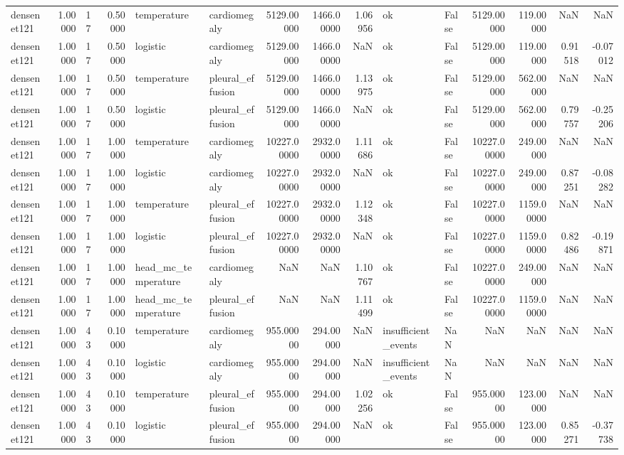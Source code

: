 \begin{tabular}{lrlrllrrrllrrrr}
densenet121 & 1.00000 & 17 & 0.50000 & temperature & cardiomegaly & 5129.00000 & 1466.00000 & 1.06956 & ok & False & 5129.00000 & 119.00000 & NaN & NaN \\
densenet121 & 1.00000 & 17 & 0.50000 & logistic & cardiomegaly & 5129.00000 & 1466.00000 & NaN & ok & False & 5129.00000 & 119.00000 & 0.91518 & -0.07012 \\
densenet121 & 1.00000 & 17 & 0.50000 & temperature & pleural\_effusion & 5129.00000 & 1466.00000 & 1.13975 & ok & False & 5129.00000 & 562.00000 & NaN & NaN \\
densenet121 & 1.00000 & 17 & 0.50000 & logistic & pleural\_effusion & 5129.00000 & 1466.00000 & NaN & ok & False & 5129.00000 & 562.00000 & 0.79757 & -0.25206 \\
densenet121 & 1.00000 & 17 & 1.00000 & temperature & cardiomegaly & 10227.00000 & 2932.00000 & 1.11686 & ok & False & 10227.00000 & 249.00000 & NaN & NaN \\
densenet121 & 1.00000 & 17 & 1.00000 & logistic & cardiomegaly & 10227.00000 & 2932.00000 & NaN & ok & False & 10227.00000 & 249.00000 & 0.87251 & -0.08282 \\
densenet121 & 1.00000 & 17 & 1.00000 & temperature & pleural\_effusion & 10227.00000 & 2932.00000 & 1.12348 & ok & False & 10227.00000 & 1159.00000 & NaN & NaN \\
densenet121 & 1.00000 & 17 & 1.00000 & logistic & pleural\_effusion & 10227.00000 & 2932.00000 & NaN & ok & False & 10227.00000 & 1159.00000 & 0.82486 & -0.19871 \\
densenet121 & 1.00000 & 17 & 1.00000 & head\_mc\_temperature & cardiomegaly & NaN & NaN & 1.10767 & ok & False & 10227.00000 & 249.00000 & NaN & NaN \\
densenet121 & 1.00000 & 17 & 1.00000 & head\_mc\_temperature & pleural\_effusion & NaN & NaN & 1.11499 & ok & False & 10227.00000 & 1159.00000 & NaN & NaN \\
densenet121 & 1.00000 & 43 & 0.10000 & temperature & cardiomegaly & 955.00000 & 294.00000 & NaN & insufficient\_events & NaN & NaN & NaN & NaN & NaN \\
densenet121 & 1.00000 & 43 & 0.10000 & logistic & cardiomegaly & 955.00000 & 294.00000 & NaN & insufficient\_events & NaN & NaN & NaN & NaN & NaN \\
densenet121 & 1.00000 & 43 & 0.10000 & temperature & pleural\_effusion & 955.00000 & 294.00000 & 1.02256 & ok & False & 955.00000 & 123.00000 & NaN & NaN \\
densenet121 & 1.00000 & 43 & 0.10000 & logistic & pleural\_effusion & 955.00000 & 294.00000 & NaN & ok & False & 955.00000 & 123.00000 & 0.85271 & -0.37738 \\

\end{tabular}

